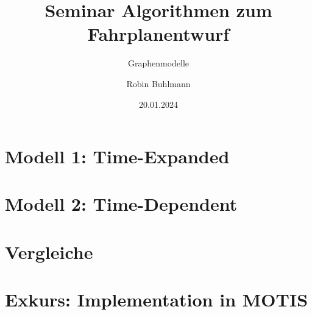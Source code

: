 \documentclass[
	ngerman,
	aspectratio=43,
	color={accentcolor=11c},
	logo=false,
	colorframetitle=false,
	]{tudabeamer}
\title{Seminar Algorithmen zum Fahrplanentwurf}
\subtitle{Graphenmodelle}
\author[R. Buhlmann]{Robin Buhlmann}
\date{20.01.2024}
\begin{document}
\maketitle



\section{Modell 1: Time-Expanded}


\section{Modell 2: Time-Dependent}


\section{Vergleiche}


\section{Exkurs: Implementation in MOTIS}



\end{document}
